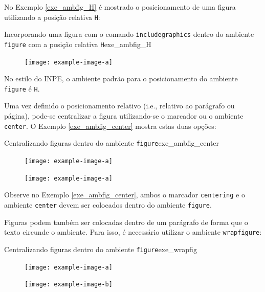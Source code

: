 No Exemplo \ref{exe_ambfig_H} é mostrado o posicionamento de uma figura utilizando a posição relativa {\tt H}:

\begin{texexptitled}[breakable,enhanced,middle=2mm]{Incorporando uma figura com o comando {\tt includegraphics} dentro do ambiente {\tt figure} com a posição relativa {\tt H}}{exe_ambfig_H}
\lipsum[1]
\begin{figure}[H]
\texttt{[image: example-image-a]}
\end{figure}
\lipsum[2]
\end{texexptitled}

\begin{marker}
  No estilo do INPE, o ambiente padrão para o posicionamento do ambiente {\tt figure} é {\tt H}.
\end{marker}

Uma vez definido o posicionamento relativo (i.e., relativo ao parágrafo ou página), pode-se centralizar a figura utilizando-se o marcador \texttt{\centering} ou o ambiente {\tt center}. O Exemplo \ref{exe_ambfig_center} mostra estas duas opções:

\begin{texexptitled}[breakable,enhanced,middle=2mm]{Centralizando figuras dentro do ambiente {\tt figure}}{exe_ambfig_center}
\lipsum[1]
\begin{figure}[H]
\centering
\texttt{[image: example-image-a]}
\end{figure}
\lipsum[2]
\begin{figure}[H]
    \begin{center}
        \texttt{[image: example-image-a]}
    \end{center}
\end{figure}
\end{texexptitled}

Observe no Exemplo \ref{exe_ambfig_center}, ambos o marcador \texttt{centering} e o ambiente {\tt center} devem ser colocados dentro do ambiente {\tt figure}.

Figuras podem também ser colocadas dentro de um parágrafo de forma que o texto circunde o ambiente. Para isso, é necessário utilizar o ambiente {\tt wrapfigure}:

\begin{texexptitled}[enhanced,middle=2mm]{Centralizando figuras dentro do ambiente {\tt figure}}{exe_wrapfig}
\begin{figure}
    \centering
    \texttt{[image: example-image-a]}
\end{figure}
\lipsum[2]

\begin{figure}
    \centering
    \texttt{[image: example-image-b]}
\end{figure}
\lipsum[3]
\end{texexptitled}

